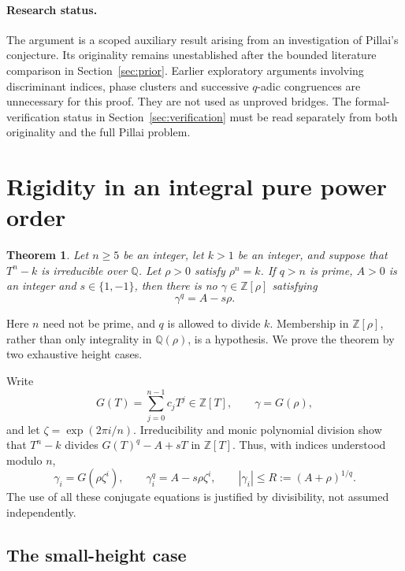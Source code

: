 \documentclass[11pt,letterpaper]{article}
\newtheorem{theorem}{Theorem}[section]
\theoremstyle{remark}\newtheorem{remark}[theorem]{Remark}
\newcommand{\Q}{\mathbb Q}
\newcommand{\Z}{\mathbb Z}
\begin{document}
\paragraph{Research status.}
The argument is a scoped auxiliary result arising from an investigation of
Pillai's conjecture. Its originality remains unestablished after the bounded
literature comparison in Section~\ref{sec:prior}. Earlier exploratory
arguments involving discriminant indices, phase clusters and successive
$q$-adic congruences are unnecessary for this proof. They are not used as
unproved bridges. The formal-verification status in Section~\ref{sec:verification}
must be read separately from both originality and the full Pillai problem.

\section{Rigidity in an integral pure power order}\label{sec:order}

\begin{theorem}\label{thm:order}
Let $n\ge5$ be an integer, let $k>1$ be an integer, and suppose that
$T^n-k$ is irreducible over $\Q$. Let $\rho>0$ satisfy $\rho^n=k$.
If $q>n$ is prime, $A>0$ is an integer and $s\in\{1,-1\}$, then there is no
$\gamma\in\Z[\rho]$ satisfying
\begin{equation}\label{eq:orderpower}
                         \gamma^q=A-s\rho.
\end{equation}
\end{theorem}

Here $n$ need not be prime, and $q$ is allowed to divide $k$. Membership in
$\Z[\rho]$, rather than only integrality in $\Q(\rho)$, is a hypothesis.
We prove the theorem by two exhaustive height cases.

Write
\[
 G(T)=\sum_{j=0}^{n-1}c_jT^j\in\Z[T],\qquad \gamma=G(\rho),
\]
and let $\zeta=\exp(2\pi i/n)$. Irreducibility and monic polynomial division
show that $T^n-k$ divides $G(T)^q-A+sT$ in $\Z[T]$. Thus, with indices
understood modulo $n$,
\begin{equation}\label{eq:conjugates}
 \gamma_i=G(\rho\zeta^i),\qquad
 \gamma_i^q=A-s\rho\zeta^i,\qquad
 |\gamma_i|\le R:=(A+\rho)^{1/q}.
\end{equation}
The use of all these conjugate equations is justified by divisibility,
not assumed independently.

\subsection{The small-height case}
\end{document}
